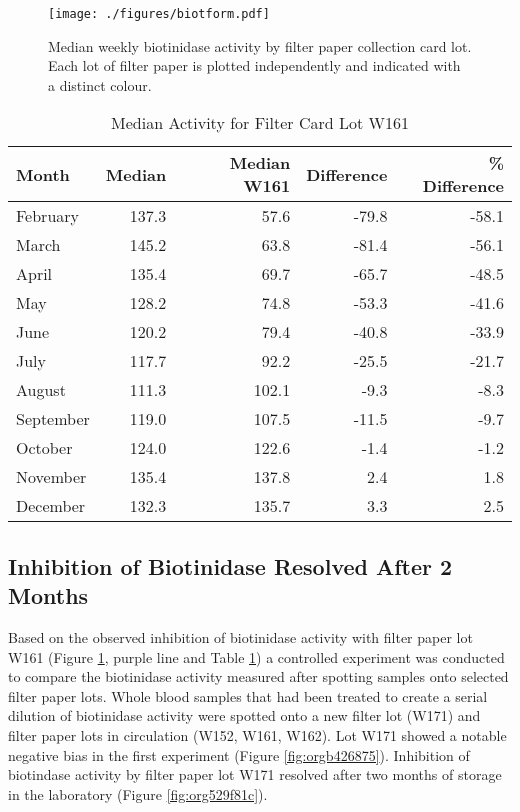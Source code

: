 \documentclass[review]{elsarticle}
\begin{document}
\begin{figure}[htbp]
\centering
\texttt{[image: ./figures/biotform.pdf]}
\caption{\label{fig:org4b8d732}Median weekly biotinidase activity by filter paper collection card lot. Each lot of filter paper is plotted independently and indicated with a distinct colour.}
\end{figure}

\clearpage

\begin{table}[ht]
\centering
\begin{tabular}{lrrrr}
  \hline
Month & Median & Median W161 & Difference & \% Difference \\ 
  \hline
February & 137.3 & 57.6 & -79.8 & -58.1 \\ 
  March & 145.2 & 63.8 & -81.4 & -56.1 \\ 
  April & 135.4 & 69.7 & -65.7 & -48.5 \\ 
  May & 128.2 & 74.8 & -53.3 & -41.6 \\ 
  June & 120.2 & 79.4 & -40.8 & -33.9 \\ 
  July & 117.7 & 92.2 & -25.5 & -21.7 \\ 
  August & 111.3 & 102.1 & -9.3 & -8.3 \\ 
  September & 119.0 & 107.5 & -11.5 & -9.7 \\ 
  October & 124.0 & 122.6 & -1.4 & -1.2 \\ 
  November & 135.4 & 137.8 & 2.4 & 1.8 \\ 
  December & 132.3 & 135.7 & 3.3 & 2.5 \\ 
   \hline
\end{tabular}
\caption{Median Activity for Filter Card Lot W161} 
\label{tab:w161_months}
\end{table}

\subsection*{Inhibition of Biotinidase Resolved After 2 Months}
\label{sec:orgc72b7ea}
Based on the observed inhibition of biotinidase activity with filter
paper lot W161 (Figure \ref{fig:org4b8d732}, purple line and Table
\ref{tab:w161_months}) a controlled experiment was conducted to
compare the biotinidase activity measured after spotting samples onto
selected filter paper lots. Whole blood samples that had been treated
to create a serial dilution of biotinidase activity were spotted onto
a new filter lot (W171) and filter paper lots in circulation (W152,
W161, W162). Lot W171 showed a notable negative bias in the first experiment (Figure
\ref{fig:orgb426875}). Inhibition of biotindase activity by filter paper lot W171
resolved after two months of storage in the laboratory (Figure
\ref{fig:org529f81c}).
\end{document}
